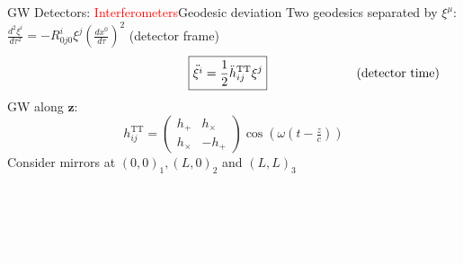 \documentclass[xcolor=dvipsnames,t]{beamer}
\newcommand{\todo}[1]{\textcolor{orange}{\texttt{TODO: #1}}}
\newcommand{\red}[1]{\textcolor{red}{#1}}
\newcommand{\w}[1]{\textcolor{white}{#1}}
\begin{document}
 \begin{frame}{GW Detectors: \red{Interferometers}}{Geodesic deviation}
    Two geodesics separated by $\xi^\mu$:
    $ \tfrac{d^2 \xi^i}{d\tau^2} = -R^i_{0j0} \xi^j\left(\tfrac{dx^0}{d\tau}\right)^2$ \hfill (detector frame)\\
    \vspace{-3mm}
    \[
    \hspace{4.5cm} \boxed{\ddot{\xi^i} = \frac{1}{2} \ddot{h}_{ij}^\text{TT} \xi^j} \hspace{2.5cm} \text{(detector time)}
    \]
    GW along $\mathbf{z}$: 
      \[
      h_{ij}^\text{TT} = \left(\begin{array}{cc}
				h_+ & h_\times \\
				h_\times & - h_+
				\end{array}\right) \cos\left(\omega\left( t-\tfrac{z}{c}\right)\right)
      \]
      Consider mirrors at $(0,0)_1, (L,0)_2$ and $(L,L)_3$
          \begin{small}
      \begin{align*}
	\w{s_{12} }& \w{=\int_1^2 \tfrac{ds}{dx}dx = (x_2-x_1) \left[ 1 + h_+ \cos(\omega t)\right]^{1/2}\hspace{4cm} }\\
	   &\w{ \approx L \left[ 1+\tfrac{1}{2} h_+ \cos\omega t \right] }\\
      \w{s_{13}} &\w{\approx L \left[ 1-\tfrac{1}{2} h_+ \cos\omega t \right]}
      \end{align*}
      \end{small}
 \end{frame}
 
\end{document}
